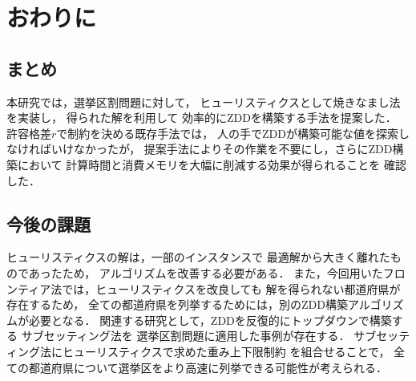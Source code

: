 \chapter{おわりに} \label{chapter:6}
\section{まとめ}
本研究では，選挙区割問題に対して，
ヒューリスティクスとして焼きなまし法を実装し，
得られた解を利用して
効率的にZDDを構築する手法を提案した．
許容格差$r$で制約を決める既存手法では，
人の手でZDDが構築可能な値を探索しなければいけなかったが，
提案手法によりその作業を不要にし，さらにZDD構築において
計算時間と消費メモリを大幅に削減する効果が得られることを
確認した．

\section{今後の課題}
ヒューリスティクスの解は，一部のインスタンスで
最適解から大きく離れたものであったため，
アルゴリズムを改善する必要がある．
また，今回用いたフロンティア法では，ヒューリスティクスを改良しても
解を得られない都道府県が存在するため，
全ての都道府県を列挙するためには，別のZDD構築アルゴリズムが必要となる．
関連する研究として，ZDDを反復的にトップダウンで構築する
サブセッティング法\cite{iwashita}を
選挙区割問題に適用した事例\cite{yamazaki}が存在する．
サブセッティング法にヒューリスティクスで求めた重み上下限制約
を組合せることで，
全ての都道府県について選挙区をより高速に列挙できる可能性が考えられる．
